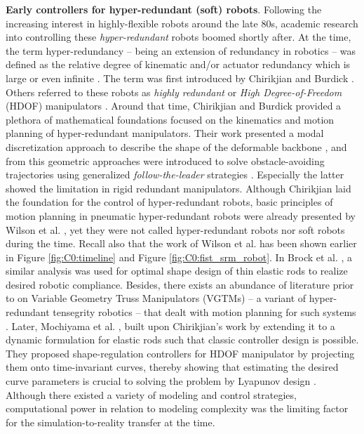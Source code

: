 \par \textbf{Early controllers for hyper-redundant (soft) robots}. Following the increasing interest in highly-flexible robots around the late 80s, academic research into controlling these \textit{hyper-redundant} robots boomed shortly after. At the time, the term hyper-redundancy -- being an extension of redundancy in robotics \cite{MerriamWebster1983} -- was defined as the relative degree of kinematic and/or actuator redundancy which is large or even infinite \cite{Chirikjian1992, Chirikjian1994}. The term was first introduced by Chirikjian and Burdick \cite{Chirikjian1989}. Others referred to these robots as \textit{highly redundant} \cite{Wilson1988Dec, Naccarato1989Dec} or \textit{High Degree-of-Freedom} (HDOF) manipulators \cite{Salerno1989Jan, Mochiyama1999}. Around that time, Chirikjian and Burdick provided a plethora of mathematical foundations \cite{Chirikjian1994, Chirikjian1994Jun, Chirikjian1991, Chirikjian1992, Chirikjian1992Dec} focused on the kinematics and motion planning of hyper-redundant manipulators. Their work presented a modal discretization approach to describe the shape of the deformable backbone \cite{Chirikjian1994Jun}, and from this geometric approaches were introduced to solve obstacle-avoiding trajectories using generalized \textit{follow-the-leader} strategies \cite{Chirikjian1992Dec}. Especially the latter showed the limitation in rigid redundant manipulators. Although Chirikjian laid the foundation for the control of hyper-redundant robots, basic principles of motion planning in pneumatic hyper-redundant robots were already presented by Wilson et al. \cite{Wilson1988Dec, Wilson1989Jun}, yet they were not called hyper-redundant robots nor soft robots during the time. Recall also that the work of Wilson et al. has been shown earlier in Figure \ref{fig:C0:timeline} and Figure \ref{fig:C0:fist_srm_robot}. In Brock et al. \cite{Brock1991}, a similar analysis was used for optimal shape design of thin elastic rods to realize desired robotic compliance. Besides, there exists an abundance of literature prior to \cite{Chirikjian1992} on Variable Geometry Truss Manipulators (VGTMs) -- a variant of hyper-redundant tensegrity robotics -- that dealt with motion planning for such systems \cite{Naccarato1989Dec, Naccarato1991Apr, Salerno1989Jan}. Later, Mochiyama et al. \cite{Mochiyama1998, Mochiyama1999}, built upon Chirikjian's work by extending it to a dynamic formulation for elastic rods such that classic controller design is possible. They proposed shape-regulation controllers for HDOF manipulator by projecting them onto time-invariant curves, thereby showing that estimating the desired curve parameters is crucial to solving the problem by Lyapunov design \cite{Mochiyama1998}. Although there existed a variety of modeling and control strategies, computational power in relation to modeling complexity was the limiting factor for the simulation-to-reality transfer at the time.